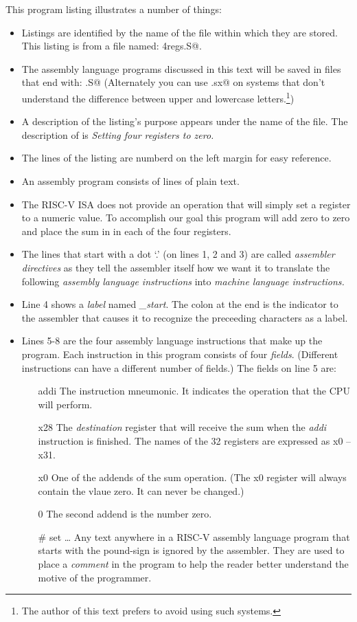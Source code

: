 This program listing illustrates a number of things: 
\begin{itemize}
\item Listings are identified by the name of the file within which
	they are stored.  This listing is from a file named: \verb@zero4regs.S@.
\item The assembly language programs discussed in this text will be saved
	in files that end with: \verb@.S@  (Alternately you can use \verb@.sx@ 
	on systems that don't understand the difference between upper and 
	lowercase letters.\footnote{The author of this text prefers to avoid
	using such systems.})
\item A description of the listing's purpose appears under the name of the
	file.  The description of  is 
	{\em Setting four registers to zero.}
\item The lines of the listing are numberd on the left margin for
	easy reference.
\item An assembly program consists of lines of plain text.
\item The RISC-V ISA does not provide an operation that will simply 
	set a register to a numeric value.  To accomplish our goal this
	program will add zero to zero and place the sum in in each of the
	four registers.
\item The lines that start with a dot `.' (on lines 1, 2 and 3) are 
	called {\em assembler directives} as they tell the assembler itself
	how we want it to translate the following {\em assembly language instructions} 
	into {\em machine language instructions.}  
\item Line 4 shows a {\em label} named {\em \_start}.  The colon
	at the end is the indicator to the assembler that causes it to
	recognize the preceeding characters as a label.
\item Lines 5-8 are the four assembly language instructions that
	make up the program.  Each instruction in this program
	consists of four {\em fields}.  (Different instructions can have 
	a different number of fields.)  The fields on line 5 are:

	\begin{itemize}
	\item [addi] The instruction mneumonic.  It indicates the operation 
		that the CPU will perform.
	\item [x28] The {\em destination} register that will receive the 
		sum when the {\em addi} instruction is finished.  The names of
		the 32 registers are expressed as x0 -- x31.
	\item [x0] One of the addends of the sum operation.  (The x0 register
		will always contain the vlaue zero.  It can never be changed.)
	\item [0] The second addend is the number zero.
		\item [\# set \ldots] Any text anywhere in a RISC-V assembly language
	program that starts with the pound-sign is ignored by the assembler.
			They are used to place a {\em comment} in the program to help
	the reader better understand the motive of the programmer.
	\end{itemize}
\end{itemize}


